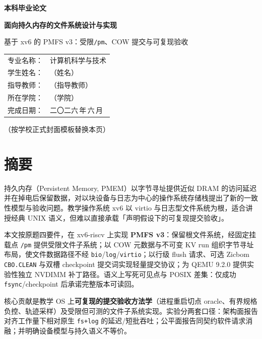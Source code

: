 \documentclass[UTF8,a4paper,zihao=-4,oneside,openany]{ctexbook}
\newcommand{\ThesisTitle}{面向持久内存的文件系统设计与实现}
\newcommand{\ThesisSubtitle}{基于 xv6 的 PMFS v3：受限\texttt{/pm}、COW 提交与可复现验收}
\newcommand{\ThesisAuthor}{（姓名）}
\newcommand{\ThesisAdvisor}{（指导教师）}
\newcommand{\ThesisSchool}{（学院）}
\newcommand{\ThesisMajor}{计算机科学与技术}
\newcommand{\ThesisDate}{二〇二六\,年\,六\,月}
\begin{document}
\begin{titlepage}
\thispagestyle{empty}
\centering
\vspace*{1.2cm}
{\Large\bfseries 本科毕业论文\par}
\vspace{1.8cm}
{\bfseries \ThesisTitle\par}
\vspace{0.6cm}
{\large \ThesisSubtitle\par}
\vspace{2.2cm}
\begin{tabular}{rl}
专业名称： & \ThesisMajor \\[0.6em]
学生姓名： & \ThesisAuthor \\[0.6em]
指导教师： & \ThesisAdvisor \\[0.6em]
所在学院： & \ThesisSchool \\[0.6em]
完成日期： & \ThesisDate \\
\end{tabular}
\vfill
{\large （按学校正式封面模板替换本页）\par}
\end{titlepage}

\frontmatter
{}

\chapter*{摘\quad 要}

持久内存（Persistent Memory, PMEM）以字节寻址提供近似 DRAM 的访问延迟并在掉电后保留数据，对以块设备与日志为中心的操作系统存储栈提出了新的一致性模型与验收问题。教学操作系统 xv6 以 virtio 与日志型文件系统为根，适合讲授经典 UNIX 语义，但难以直接承载「声明假设下的可复现提交验收」。

本文按原题四要件，在 xv6-riscv 上实现 \textbf{PMFS v3}：保留根文件系统，经固定挂载点 \texttt{/pm} 提供受限文件子系统；以 COW 元数据与不可变 KV run 组织字节寻址布局，使文件数据路径不经 \texttt{bio}/\texttt{log}/\texttt{virtio}；以行级 flush 请求、可选 Zicbom \texttt{CBO.CLEAN} 与双槽 checkpoint 提交词实现轻量提交协议；为 QEMU 9.2.0 提供实验性独立 NVDIMM 补丁路径。语义上写死可见点与 POSIX 差集：仅成功 \texttt{fsync}/checkpoint 后承诺完整版本可读回。

核心贡献是教学 OS 上\textbf{可复现的提交验收方法学}（进程重启切点 oracle、有界规格负控、轨迹采样）及受限但可测的文件子系统实现。实验分两套口径：架构面报告对齐工作量下相对原生 \texttt{fs+log} 的延迟/短批吞吐；公平面报告同契约软件请求消融；并明确设备模型与持久语义不等价。
\end{document}

